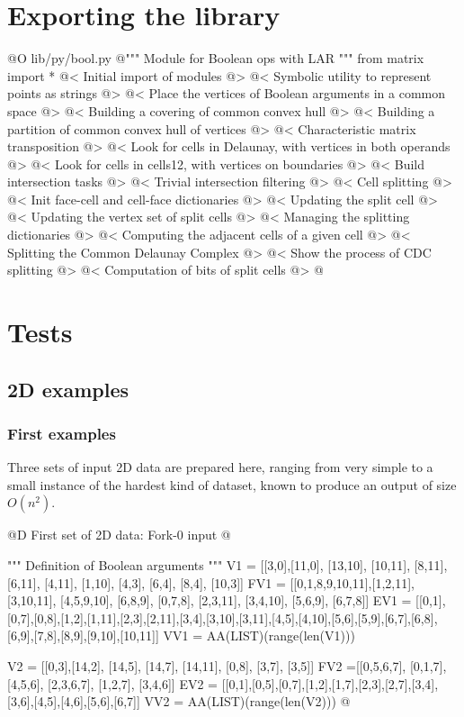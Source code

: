 \documentclass[11pt,oneside]{article}	%
\begin{document}
\section{Exporting the library}


@O lib/py/bool.py
@{""" Module for Boolean ops with LAR """
from matrix import *
@< Initial import of modules @>
@< Symbolic utility to represent points as strings @>
@< Place the vertices of Boolean arguments in a common space @>
@< Building a covering of common convex hull @>
@< Building a partition of common convex hull of vertices @>
@< Characteristic matrix transposition @>
@< Look for cells in Delaunay, with vertices in both operands @>
@< Look for cells in cells12, with vertices on boundaries @>
@< Build intersection tasks @>
@< Trivial intersection filtering @>
@< Cell splitting @>
@< Init face-cell and cell-face dictionaries @>
@< Updating the split cell @>
@< Updating the vertex set  of split cells @>
@< Managing the splitting dictionaries @>
@< Computing the adjacent cells of a given cell @>
@< Splitting the Common Delaunay Complex @>
@< Show the process of CDC splitting @>
@< Computation of bits of split cells @>
@}

\section{Tests}



\subsection{2D examples}

\subsubsection{First examples}

Three sets of input 2D data are prepared here, ranging from very simple to a small instance of the hardest kind of dataset, known to produce an output of size $O(n^2)$.


@D First set of 2D data: Fork-0 input
@{""" Definition of Boolean arguments """
V1 = [[3,0],[11,0], [13,10], [10,11], [8,11], [6,11], [4,11], [1,10], [4,3], [6,4], 
	[8,4], [10,3]]
FV1 = [[0,1,8,9,10,11],[1,2,11], [3,10,11], [4,5,9,10], [6,8,9], [0,7,8], [2,3,11],
	[3,4,10], [5,6,9], [6,7,8]]
EV1 = [[0,1],[0,7],[0,8],[1,2],[1,11],[2,3],[2,11],[3,4],[3,10],[3,11],[4,5],[4,10],[5,6],[5,9],[6,7],[6,8],[6,9],[7,8],[8,9],[9,10],[10,11]]
VV1 = AA(LIST)(range(len(V1)))

V2 = [[0,3],[14,2], [14,5], [14,7], [14,11], [0,8], [3,7], [3,5]]
FV2 =[[0,5,6,7], [0,1,7], [4,5,6], [2,3,6,7], [1,2,7], [3,4,6]]
EV2 = [[0,1],[0,5],[0,7],[1,2],[1,7],[2,3],[2,7],[3,4],[3,6],[4,5],[4,6],[5,6],[6,7]]
VV2 = AA(LIST)(range(len(V2)))
@}
\end{document}
